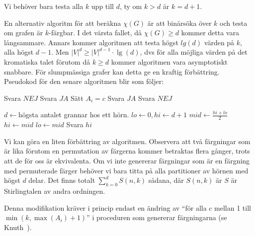 \documentclass[a4paper]{report}
\begin{document}
Vi behöver bara testa alla $k$ upp till $d$, ty om $k > d$ är $k = d + 1$. 

En alternativ algoritm för att beräkna $\chi(G)$ är att binärsöka över $k$ och testa om grafen är $k$-färgbar. I det värsta fallet, då $\chi(G) \ge d$ kommer detta vara långsammare.
Annars kommer algoritmen att testa högst $lg (d)$ värden på $k$, alla högst $d-1$. Men $|V|^{d} \ge |V|^{d-1}\cdot{\lg(d)}$, dvs för alla möjliga värden på
det kromatiska talet förutom då $k \ge d$ kommer algoritmen vara asymptotiskt snabbare. För slumpmässiga grafer kan detta ge en kraftig förbättring. Pseudokod
för den senare algoritmen blir som följer:

\clearpage

\begin{algorithmic}[1]
                    \State Svara $NEJ$
                \EndIf
            \EndFor
            \State Svara $JA$
        \EndIf
            \State Sätt $A_i = c$
                \State Svara $JA$
            \EndIf
        \EndFor
        \State Svara $NEJ$
    \EndProcedure

        \State $d \gets $högsta antalet grannar hos ett hörn.
        \State $lo \gets 0, hi \gets d+1$
            \State $mid \gets \frac{hi + lo}{2}$
                \State $hi \gets mid$
            \Else
                \State $lo \gets mid$
            \EndIf
        \EndWhile
        \State Svara $hi$
    \EndProcedure
\end{algorithmic}

Vi kan göra en liten förbättring av algoritmen. Observera att två färgningar som är lika förutom en permutation av färgerna kommer betraktas flera gånger, trots att de för oss är ekvivalenta. Om vi inte genererar färgningar som är en färgning med permuterade färger behöver vi bara titta på alla partitioner av hörnen med högst $d$ delar. Det finns totalt $\sum_{k=0}^d{S(n, k)}$ sådana, där $S(n, k)$ är $S$ är Stirlingtalen av andra ordningen.

Denna modifikation kräver i princip endast en ändring av ``för alla $c$ mellan 1 till $\min(k, \max(A_i) + 1)$'' i proceduren som genererar färgningarna (se Knuth~\cite{Knuth4a:1997}).
\end{document}
